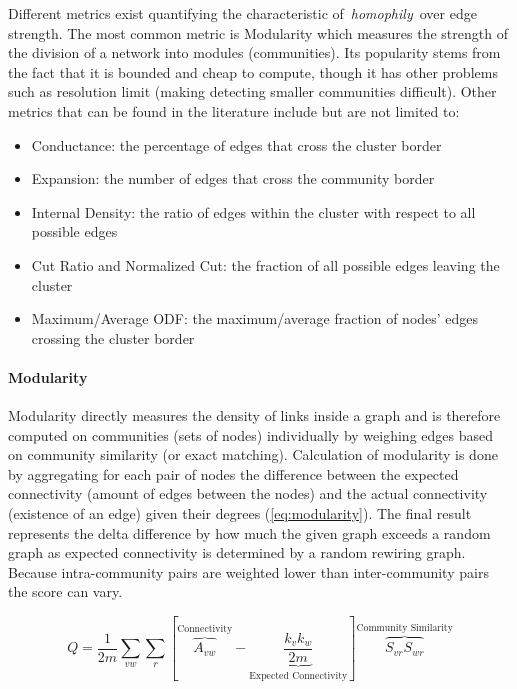 \documentclass[
acmsmall,
nonacm,
screen,
acmthm]{../../scripts/pandoc/templates/acmart}
\providecommand{\tightlist}{%
\setlength{\itemsep}{0pt}\setlength{\parskip}{0pt}}
\begin{document}
Different metrics exist quantifying the characteristic
of~\emph{homophily}~over edge strength. The most common metric is
Modularity which measures the strength of the division of a network into
modules (communities). Its popularity stems from the fact that it is
bounded and cheap to compute, though it has other problems such as
resolution limit (making detecting smaller communities difficult). Other
metrics that can be found in the literature include but are not limited
to:

\begin{itemize}
\tightlist
\item
  Conductance: the percentage of edges that cross the cluster border
\item
  Expansion: the number of edges that cross the community border
\item
  Internal Density: the ratio of edges within the cluster with respect
  to all possible edges
\item
  Cut Ratio and Normalized Cut: the fraction of all possible edges
  leaving the cluster
\item
  Maximum/Average ODF: the maximum/average fraction of nodes' edges
  crossing the cluster border
\end{itemize}

\hypertarget{modularity}{%
\paragraph{Modularity}\label{modularity}}

Modularity directly measures the density of links inside a graph and is
therefore computed on communities (sets of nodes) individually by
weighing edges based on community similarity (or exact matching).
Calculation of modularity is done by aggregating for each pair of nodes
the difference between the expected connectivity (amount of edges
between the nodes) and the actual connectivity (existence of an edge)
given their degrees (\cref{eq:modularity}). The final result represents
the delta difference by how much the given graph exceeds a random graph
as expected connectivity is determined by a random rewiring graph.
Because intra-community pairs are weighted lower than inter-community
pairs the score can vary.

\begin{equation}
Q=\frac{1}{2 m}\sum_{v w}\sum_{r}\left[\overbrace{A_{v w}}^{\text{Connectivity}}-\underbrace{\frac{k_{v} k_{w}}{2 m}}_{\text{Expected Connectivity}}\right] \overbrace{S_{v r} S_{w r}}^{\text{Community Similarity}}
\label{eq:modularity}\end{equation}
\end{document}
